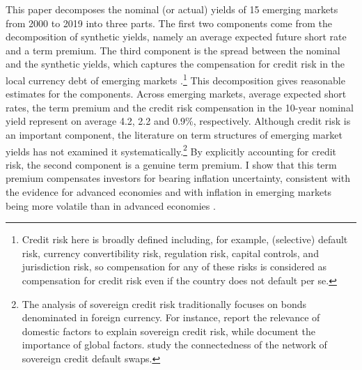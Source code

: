 {This paper decomposes the nominal (or actual) yields of 15 emerging markets from 2000 to 2019 %
into three parts. The first two components come from the decomposition of synthetic yields, namely an average expected future short rate and a term premium. The third component is the spread between the nominal and the synthetic yields, which captures the compensation for credit risk in the local currency debt of emerging markets \citep{DuSchreger:2016JoF}.\footnote{ Credit risk here is broadly defined including, for example, (selective) default risk, currency convertibility risk, regulation risk, capital controls, and jurisdiction risk, so compensation for any of these risks is considered as compensation for credit risk even if the country does not default per se.}
This decomposition gives reasonable estimates for the components.
Across emerging markets, average expected short rates, the term premium and the credit risk compensation in the 10-year nominal yield represent on average 4.2, 2.2 and 0.9\%, respectively.
Although credit risk is an important component, %
the literature on term structures of emerging market yields has not examined it systematically.\footnote{ The analysis of sovereign credit risk traditionally focuses on bonds denominated in foreign currency. For instance, \cite{HilscherNosbusch:2010} report the relevance of domestic factors to explain sovereign credit risk, while \cite{Longstaffetal:2011} document the importance of global factors. \cite{BostanciYilmaz:2020} study the connectedness of the network of sovereign credit default swaps.} By explicitly accounting for credit risk, the second component is a genuine term premium. %
I show that this term premium %
compensates investors for bearing inflation uncertainty, consistent with the evidence for advanced economies \citep{Wright:2011} and with inflation in emerging markets being more volatile than in advanced economies \citep{HaKoseOhnsorge:2019}.  

}
